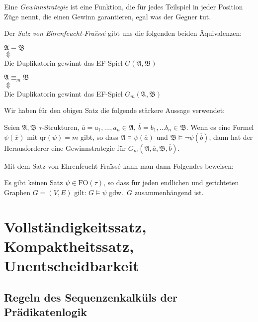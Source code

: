 \documentclass[a4paper,parskip=half*,DIV=15,fontsize=11pt]{scrartcl}
\newcommand{\A}{\mathfrak{A}}
\newcommand{\B}{\mathfrak{B}}
\newcommand{\FO}{\mathrm{FO}}
\newcommand{\qr}{\mathrm{qr}}
\begin{document}
Eine \emph{Gewinnstrategie} ist eine Funktion, die für jedes Teilspiel in jeder Position Züge nennt, die einen Gewinn garantieren, egal was der Gegner tut.

Der \emph{Satz von Ehrenfeucht-Fra\"issé} gibt uns die folgenden beiden Äquivalenzen:

\begin{center}
\begin{minipage}{0.3\textwidth}
\centering
$\A \equiv \B$ \\
$\Updownarrow$ \\
Die Duplikatorin gewinnt das EF-Spiel $G(\A, \B)$
\end{minipage}\hspace{0.1\textwidth}
\begin{minipage}{0.3\textwidth}
\centering
$\A \equiv_m \B$ \\
$\Updownarrow$ \\
Die Duplikatorin gewinnt das EF-Spiel $G_m(\A, \B)$
\end{minipage}
\end{center}

Wir haben für den obigen Satz die folgende stärkere Aussage verwendet:

Seien $\A, \B$ $\tau$-Strukturen, $\overline{a} = a_1, \ldots, a_n \in \A,\ \overline{b} = b_1, \ldots b_n \in \B$. Wenn es eine Formel $\psi(\overline{x})$ mit $\qr(\psi) = m$ gibt, so dass $\A \models \psi(\overline{a})$ und $\B \models \neg \psi(\overline{b})$, dann hat der Herausforderer eine Gewinnstrategie für $G_m(\A, \overline{a}, \B, \overline{b})$.

Mit dem Satz von Ehrenfeucht-Fra\"issé kann man dann Folgendes beweisen:

Es gibt keinen Satz $\psi \in \FO(\tau)$, so dass für jeden endlichen und gerichteten Graphen $G = (V, E)$ gilt: $G \models \psi$ gdw.\ $G$ zusammenhängend ist.

\section{Vollständigkeitssatz, Kompaktheitssatz, Unentscheidbarkeit}

\subsection{Regeln des Sequenzenkalküls der Prädikatenlogik}
\end{document}

